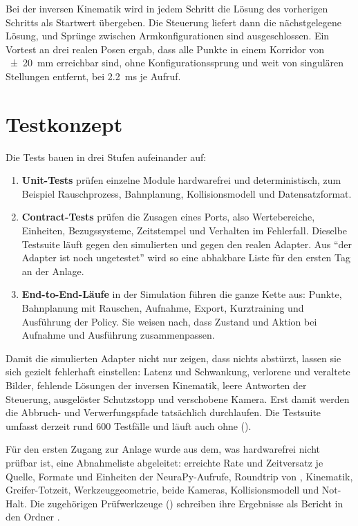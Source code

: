 Bei der inversen Kinematik wird in jedem Schritt die Lösung des vorherigen Schritts als
Startwert übergeben. Die Steuerung liefert dann die nächstgelegene Lösung, und Sprünge
zwischen Armkonfigurationen sind ausgeschlossen. Ein Vortest an drei realen Posen ergab, dass
alle Punkte in einem Korridor von \SI{\pm 20}{\milli\metre} erreichbar sind, ohne
Konfigurationssprung und weit von singulären Stellungen entfernt, bei
\SI{2.2}{\milli\second} je Aufruf.

\section{Testkonzept}
\label{sec:testkonzept}

Die Tests bauen in drei Stufen aufeinander auf:
\begin{enumerate}
  \item \textbf{Unit-Tests} prüfen einzelne Module hardwarefrei und deterministisch, zum
    Beispiel Rauschprozess, Bahnplanung, Kollisionsmodell und Datensatzformat.
  \item \textbf{Contract-Tests} prüfen die Zusagen eines Ports, also Wertebereiche,
    Einheiten, Bezugssysteme, Zeitstempel und Verhalten im Fehlerfall. Dieselbe Testsuite
    läuft gegen den simulierten und gegen den realen Adapter. Aus \enquote{der Adapter ist
    noch ungetestet} wird so eine abhakbare Liste für den ersten Tag an der Anlage.
  \item \textbf{End-to-End-Läufe} in der Simulation führen die ganze Kette aus: Punkte,
    Bahnplanung mit Rauschen, Aufnahme, Export, Kurztraining und Ausführung der Policy. Sie
    weisen nach, dass Zustand und Aktion bei Aufnahme und Ausführung zusammenpassen.
\end{enumerate}

Damit die simulierten Adapter nicht nur zeigen, dass nichts abstürzt, lassen sie sich gezielt
fehlerhaft einstellen: Latenz und Schwankung, verlorene und veraltete Bilder, fehlende
Lösungen der inversen Kinematik, leere Antworten der Steuerung, ausgelöster Schutzstopp und
verschobene Kamera. Erst damit werden die Abbruch- und Verwerfungspfade tatsächlich
durchlaufen. Die Testsuite umfasst derzeit rund 600 Testfälle und läuft auch ohne
 ().

Für den ersten Zugang zur Anlage wurde aus dem, was hardwarefrei nicht prüfbar ist, eine
Abnahmeliste abgeleitet: erreichte Rate und Zeitversatz je Quelle, Formate und Einheiten der
NeuraPy-Aufrufe, Roundtrip von , Kinematik, Greifer-Totzeit,
Werkzeuggeometrie, beide Kameras, Kollisionsmodell und Not-Halt. Die zugehörigen
Prüfwerkzeuge () schreiben ihre Ergebnisse als Bericht in den
Ordner .

